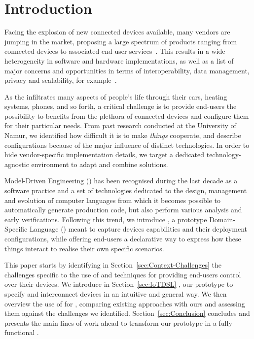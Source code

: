 \section{Introduction}
\label{sec:Introduction}

Facing the explosion of new connected devices available, many vendors are jumping in the market, proposing a large spectrum of products ranging from connected devices to associated end-user services~\cite{lee-15}. This results in a wide heterogeneity in software and hardware implementations, as well as a list of major concerns and opportunities in terms of interoperability, data management, privacy and scalability, for example~\cite{chaqfeh-12}.

As the \IOT infiltrates many aspects of people's life through their cars, heating systems, phones, and so forth, a critical challenge is to provide end-users the possibility to benefits from the plethora of connected devices and configure them for their particular needs. From past research conducted at the University of Namur, we identified how difficult it is to make \textit{things} cooperate, and describe configurations because of the major influence of distinct technologies. In order to hide vendor-specific implementation details, we target a dedicated technology-agnostic environment to adapt and combine \IOT solutions.

Model-Driven Engineering (\MDE) has been recognised during the last decade as a software practice and a set of technologies dedicated to the design, management and evolution of computer languages from which it becomes possible to automatically generate production code, but also perform various analysis and early verifications. Following this trend, we introduce \IOTDSL, a prototype Domain-Specific Language (\DSL) meant to capture \IOT devices capabilities and their deployment configurations, while offering end-users a declarative way to express how these things interact to realise their own specific scenarios.

This paper starts by identifying in Section~\ref{sec:Context-Challenges} the \IOT challenges specific to the use of \DSLS and \MDE techniques for providing end-users control over their devices. We introduce in Section~\ref{sec:IoTDSL} \IOTDSL, our prototype \DSL to specify and interconnect devices in an intuitive and general way. We then overview the use of \DSLS for \IOT, comparing existing approaches with ours and assessing them against the challenges we identified. Section~\ref{sec:Conclusion} concludes and presents the main lines of work ahead to transform our prototype in a fully functional \DSL.